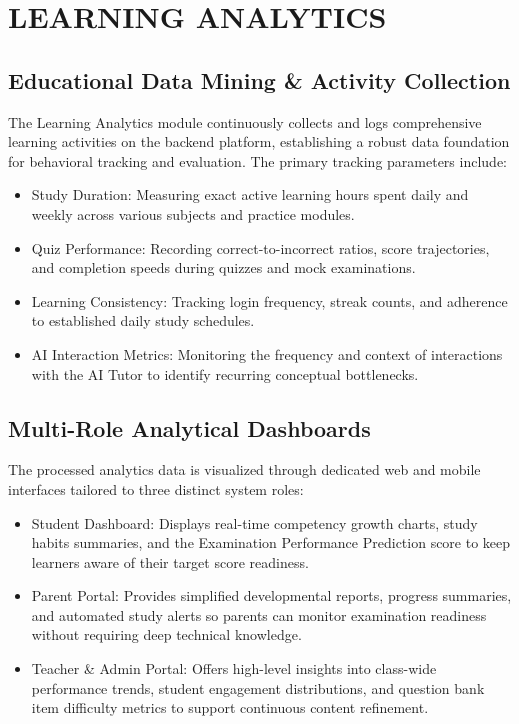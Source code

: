 \chapter{LEARNING ANALYTICS}

\section{Educational Data Mining \& Activity Collection}

The Learning Analytics module continuously collects and logs comprehensive learning activities on the backend platform, establishing a robust data foundation for behavioral tracking and evaluation. The primary tracking parameters include:

\begin{itemize}
	\item Study Duration: Measuring exact active learning hours spent daily and weekly across various subjects and practice modules.
	\item Quiz Performance: Recording correct-to-incorrect ratios, score trajectories, and completion speeds during quizzes and mock examinations.
	\item Learning Consistency: Tracking login frequency, streak counts, and adherence to established daily study schedules.
	\item AI Interaction Metrics: Monitoring the frequency and context of interactions with the AI Tutor to identify recurring conceptual bottlenecks.
\end{itemize}

\section{Multi-Role Analytical Dashboards}

The processed analytics data is visualized through dedicated web and mobile interfaces tailored to three distinct system roles:

\begin{itemize}
	\item Student Dashboard: Displays real-time competency growth charts, study habits summaries, and the Examination Performance Prediction score to keep learners aware of their target score readiness.
	\item Parent Portal: Provides simplified developmental reports, progress summaries, and automated study alerts so parents can monitor examination readiness without requiring deep technical knowledge.
	\item Teacher \& Admin Portal: Offers high-level insights into class-wide performance trends, student engagement distributions, and question bank item difficulty metrics to support continuous content refinement.
\end{itemize}

